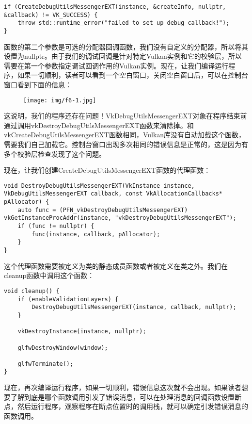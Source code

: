 \begin{lstlisting}[language={[ANSI]C}]
if (CreateDebugUtilsMessengerEXT(instance, &createInfo, nullptr,
&callback) != VK_SUCCESS) {
	throw std::runtime_error("failed to set up debug callback!");
}
\end{lstlisting}

函数的第二个参数是可选的分配器回调函数，我们没有自定义的分配器，所以将其设置为nullptr。由于我们的调试回调是针对特定Vulkan实例和它的校验层，所以需要在第一个参数指定调试回调作用的Vulkan实例。现在，让我们编译运行程序，如果一切顺利，读者可以看到一个空白窗口，关闭空白窗口后，可以在控制台窗口看到下面的信息：

\begin{figure}[H]
	\centering
	\texttt{[image: img/f6-1.jpg]}
\end{figure}

这说明，我们的程序还存在问题！VkDebugUtilsMessengerEXT对象在程序结束前通过调用vkDestroyDebugUtilsMessengerEXT函数来清除掉。和vkCreateDebugUtilsMessengerEXT函数相同，Vulkan库没有自动加载这个函数，需要我们自己加载它。控制台窗口出现多次相同的错误信息是正常的，这是因为有多个校验层检查发现了这个问题。

现在，让我们创建CreateDebugUtilsMessengerEXT函数的代理函数：

\begin{lstlisting}[language={[ANSI]C}]
void DestroyDebugUtilsMessengerEXT(VkInstance instance, VkDebugUtilsMessengerEXT callback, const VkAllocationCallbacks* pAllocator) {
	auto func = (PFN_vkDestroyDebugUtilsMessengerEXT) vkGetInstanceProcAddr(instance, "vkDestroyDebugUtilsMessengerEXT");
	if (func != nullptr) {
		func(instance, callback, pAllocator);
	}
}
\end{lstlisting}

这个代理函数需要被定义为类的静态成员函数或者被定义在类之外。我们在cleanup函数中调用这个函数：

\begin{lstlisting}[language={[ANSI]C}]
void cleanup() {
	if (enableValidationLayers) {
		DestroyDebugUtilsMessengerEXT(instance, callback, nullptr);
	}

	vkDestroyInstance(instance, nullptr);

	glfwDestroyWindow(window);

	glfwTerminate();
}
\end{lstlisting}

现在，再次编译运行程序，如果一切顺利，错误信息这次就不会出现。如果读者想要了解到底是哪个函数调用引发了错误消息，可以在处理消息的回调函数设置断点，然后运行程序，观察程序在断点位置时的调用栈，就可以确定引发错误消息的函数调用。


